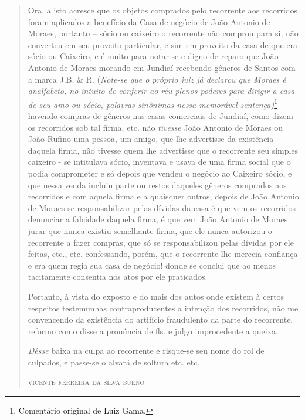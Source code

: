 {\begin{quote}
Ora, a isto acresce que os objetos comprados pelo recorrente aos
recorridos foram aplicados a benefício da Casa de negócio de João
Antonio de Moraes, portanto -- sócio ou caixeiro o recorrente não
comprou para si, não converteu em seu proveito particular, e sim em
proveito da casa de que era sócio ou Caixeiro, e é muito para notar-se e
digno de reparo que João Antonio de Moraes morando em Jundiaí recebendo
gêneros de Santos com a marca J.B. \& R. (\emph{Note-se que o próprio
juiz já declarou que Moraes é analfabeto, no intuito de conferir ao réu
plenos poderes para dirigir a casa de seu amo ou sócio, palavras
sinônimas nessa memorável sentença)}\footnote{ Comentário original de
  Luiz Gama.} havendo compras de gêneros nas casas comerciais de
Jundiaí, como dizem os recorridos sob tal firma, etc. não \emph{tivesse}
João Antonio de Moraes ou João Rufino uma pessoa, um amigo, que lhe
advertisse da existência daquela firma, não tivesse quem lhe advertisse
que o recorrente seu simples caixeiro - se intitulava sócio, inventava e
usava de uma firma social que o podia comprometer e só depois que vendeu
o negócio ao Caixeiro sócio, e que nessa venda incluiu parte ou restos
daqueles gêneros comprados aos recorridos e com aquela firma e a
quaisquer outros, depois de João Antonio de Moraes se responsabilizar
pelas dívidas da casa é que vem os recorridos denunciar a falcidade
daquela firma, é que vem João Antonio de Moraes jurar que nunca existiu
semelhante firma, que ele nunca autorizou o recorrente a fazer compras,
que só se responsabilizou pelas dívidas por ele feitas, etc., etc.
confessando, porém, que o recorrente lhe merecia confiança e era quem
regia sua casa de negócio! donde se conclui que ao menos tacitamente
consentia nos atos por ele praticados.

Portanto, à vista do exposto e do mais dos autos onde existem à certos
respeitos testemunhas contraproducentes a intenção dos recorridos, não
me convencendo da existência do artifício fraudulento da parte do
recorrente, reformo como disse a pronúncia de fls. e julgo improcedente
a queixa.

\emph{Dêsse} baixa na culpa ao recorrente e risque-se seu nome do rol de
culpados, e passe-se o alvará de soltura etc. etc.

\begin{flushright}
\textsc{vicente ferreira da silva bueno}
\end{flushright}
\end{quote}

\asterisc{}

}
